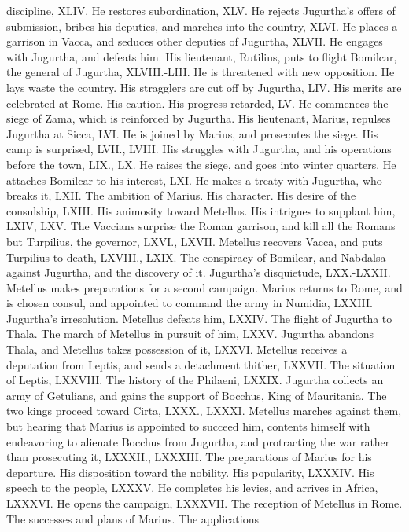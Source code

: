 discipline, XLIV. He restores subordination, XLV. He rejects
Jugurtha's offers of submission, bribes his deputies, and marches into
the country, XLVI. He places a garrison in Vacca, and seduces other
deputies of Jugurtha, XLVII. He engages with Jugurtha, and defeats
him. His lieutenant, Rutilius, puts to flight Bomilcar, the general of
Jugurtha, XLVIII.-LIII. He is threatened with new opposition. He lays
waste the country. His stragglers are cut off by Jugurtha, LIV. His
merits are celebrated at Rome. His caution. His progress retarded, LV.
He commences the siege of Zama, which is reinforced by Jugurtha. His
lieutenant, Marius, repulses Jugurtha at Sicca, LVI. He is joined by
Marius, and prosecutes the siege. His camp is surprised, LVII., LVIII.
His struggles with Jugurtha, and his operations before the town, LIX.,
LX. He raises the siege, and goes into winter quarters. He attaches
Bomilcar to his interest, LXI. He makes a treaty with Jugurtha, who
breaks it, LXII. The ambition of Marius. His character. His desire of
the consulship, LXIII. His animosity toward Metellus. His intrigues to
supplant him, LXIV, LXV. The Vaccians surprise the Roman garrison, and
kill all the Romans but Turpilius, the governor, LXVI., LXVII.
Metellus recovers Vacca, and puts Turpilius to death, LXVIII., LXIX.
The conspiracy of Bomilcar, and Nabdalsa against Jugurtha, and the
discovery of it. Jugurtha's disquietude, LXX.-LXXII. Metellus makes
preparations for a second campaign. Marius returns to Rome, and is
chosen consul, and appointed to command the army in Numidia, LXXIII.
Jugurtha's irresolution. Metellus defeats him, LXXIV. The flight of
Jugurtha to Thala. The march of Metellus in pursuit of him, LXXV.
Jugurtha abandons Thala, and Metellus takes possession of it, LXXVI.
Metellus receives a deputation from Leptis, and sends a detachment
thither, LXXVII. The situation of Leptis, LXXVIII. The history of
the Philaeni, LXXIX. Jugurtha collects an army of Getulians, and gains
the support of Bocchus, King of Mauritania. The two kings proceed
toward Cirta, LXXX., LXXXI. Metellus marches against them, but hearing
that Marius is appointed to succeed him, contents himself with
endeavoring to alienate Bocchus from Jugurtha, and protracting the war
rather than prosecuting it, LXXXII., LXXXIII. The preparations of Marius
for his departure. His disposition toward the nobility. His popularity,
LXXXIV. His speech to the people, LXXXV. He completes his levies, and
arrives in Africa, LXXXVI. He opens the campaign, LXXXVII. The reception
of Metellus in Rome. The successes and plans of Marius. The applications
